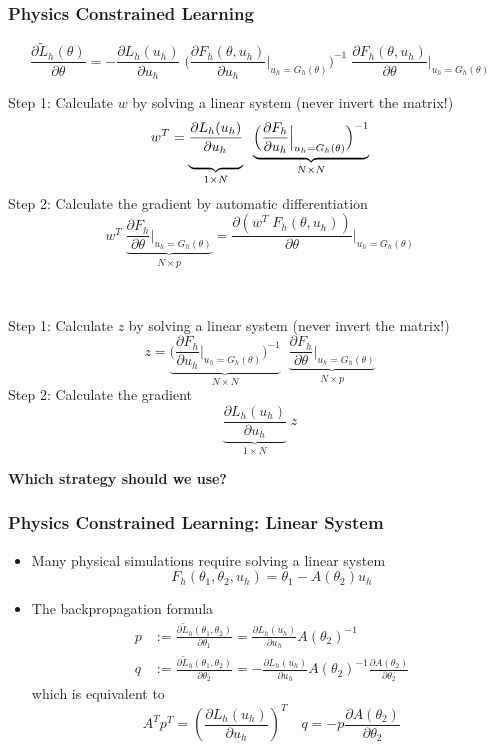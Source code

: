\documentclass{beamer}
\begin{document}
\begin{frame}
	\frametitle{Physics Constrained Learning}	
	{\scriptsize$$\boxed{\frac{{\partial {{\tilde L}_h}(\theta )}}{{\partial \theta }} 
    = - \frac{{\partial {L_h}({u_h})}}{{\partial {u_h}}} \;
    \Big( {\frac{{\partial {F_h(\theta, u_h)}}}{{\partial {u_h}}}\Big|_{u_h = {G_h}(\theta )}} \Big)^{ - 1} \;
    \frac{{\partial {F_h(\theta, u_h)}}}{{\partial \theta }}\Big|_{u_h = {G_h}(\theta )}}$$}
	\begin{minipage}[t]{0.48\textwidth}
		Step 1: Calculate $w$ by solving a linear system (never invert the matrix!)
{\scriptsize$$w^T = \underbrace{\frac{{\partial {L_h}({u_h})}}{{\partial {u_h}}\rule[-9pt]{1pt}{0pt}}}_{1\times N} 
        \;\;
        \underbrace{\Big( {\frac{{\partial {F_h}}}{{\partial {u_h}}}\Big|_{u_h = {G_h}(\theta )}} \Big)^{ - 1}}_{N\times N}$$}
Step 2: Calculate the gradient by automatic differentiation 
{\scriptsize$$w^T\;\underbrace{\frac{{\partial {F_h}}}{{\partial \theta }}\Big|_{u_h = {G_h}(\theta )}}_{N\times p} = \frac{\partial (w^T\;  {F_h}(\theta, u_h))}{\partial \theta }\Bigg|_{u_h = {G_h}(\theta )}$$}
	\end{minipage}\hfill\vline\hfill~
	\begin{minipage}[t]{0.48\textwidth}
		Step 1: Calculate $z$ by solving a linear system (never invert the matrix!)
		{\scriptsize$$z = \underbrace{
            \Big( {\frac{{\partial {F_h}}}{{\partial {u_h}}}\Big|_{u_h = {G_h}(\theta )}} \Big)^{ - 1}}_{N\times N}
            \;\; \underbrace{\frac{{\partial {F_h}}}{{\partial \theta }}\Big|_{u_h = {G_h}(\theta )}}_{N\times p}$$}
           Step 2: Calculate the gradient
           {\scriptsize$$\underbrace{\frac{{\partial {L_h}({u_h})}}{{\partial {u_h}}}}_{1\times N}\; z$$}
	\end{minipage}
	\begin{center}
		\textbf{Which strategy should we use?}
	\end{center}
\end{frame}

\begin{frame}
	\frametitle{Physics Constrained Learning: Linear System}
	
	\begin{itemize}
		\item Many physical simulations require solving a linear system 
		$$F_h(\theta_1,\theta_2, u_h) = \theta_1 - A(\theta_2)u_h$$
		\item The backpropagation formula
		\begin{align*}
			p &:=\frac{\partial \tilde L_h(\theta_1, \theta_2)}{\partial \theta_1} = \frac{\partial L_h(u_h)}{\partial u_h}A(\theta_2)^{-1}\\
			q &:=\frac{\partial \tilde L_h(\theta_1, \theta_2)}{\partial \theta_2} = -\frac{\partial L_h(u_h)}{\partial u_h}A(\theta_2)^{-1} \frac{\partial A(\theta_2)}{\partial \theta_2}
		\end{align*}
		which is equivalent to 
		$$A^T p^T =\left( \frac{\partial  L_h(u_h)}{\partial u_h} \right)^T\quad q = -p\frac{\partial A(\theta_2)}{\partial \theta_2} $$
	\end{itemize}
	
\end{frame}
\end{document}
